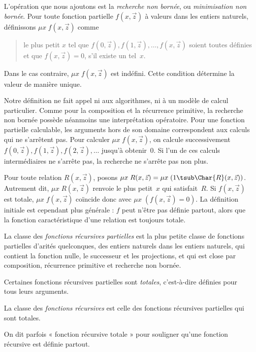 \documentclass[../../../include/open-logic-section]{subfiles}
\begin{document}
L'opération que nous ajoutons est la \emph{recherche non bornée},
ou \emph{minimisation non bornée}. Pour toute fonction partielle
$f(x,\vec z)$ à valeurs dans les entiers naturels, définissons
$\mu x \; f(x,\vec z)$ comme
\begin{quote}
  le plus petit $x$ tel que $f(0,\vec z),f(1,\vec z),
  \dots,f(x,\vec z)$ soient toutes définies et que
  $f(x,\vec z)=0$, s'il existe un tel~$x$.
\end{quote}
Dans le cas contraire, $\mu x \; f(x,\vec z)$ est indéfini.
Cette condition détermine la valeur de manière unique.

\begin{explain}
Notre définition ne fait appel ni aux algorithmes, ni à un modèle de calcul
particulier. Comme pour la composition et la récurrence
primitive, la recherche non bornée possède néanmoins une
interprétation opératoire. Pour une fonction partielle
calculable, les arguments hors de son domaine correspondent
aux calculs qui ne s'arrêtent pas. Pour calculer
$\mu x \; f(x,\vec z)$, on calcule successivement
$f(0,\vec z),f(1,\vec z),f(2,\vec z),\dots$ jusqu'à obtenir~$0$.
Si l'un de ces calculs intermédiaires ne s'arrête pas,
la recherche ne s'arrête pas non plus.
\end{explain}

Pour toute relation $R(x,\vec z)$, posons
$\mu x \; R(x,\vec z)=\mu x \; (1 \tsub \Char{R}(x,\vec z))$.
Autrement dit, $\mu x \; R(x,\vec z)$ renvoie le plus petit~$x$
qui satisfait~$R$. Si $f(x,\vec z)$ est totale,
$\mu x \; f(x,\vec z)$ coïncide donc avec
$\mu x \; (f(x,\vec z)=0)$. La définition initiale est
cependant plus générale : $f$ peut n'être pas définie
partout, alors que la fonction caractéristique d'une
relation est toujours totale.

\begin{defn}
La classe des \emph{fonctions récursives partielles} est la plus
petite classe de fonctions partielles d'arités quelconques,
des entiers naturels dans les entiers naturels, qui contient
la fonction nulle, le successeur et les projections, et qui
est close par composition, récurrence primitive et recherche
non bornée.
\end{defn}

Certaines fonctions récursives partielles sont \emph{totales},
c'est-à-dire définies pour tous leurs arguments.

\begin{defn}
La classe des \emph{fonctions récursives} est celle des
fonctions récursives partielles qui sont totales.
\end{defn}

On dit parfois « fonction récursive totale » pour souligner
qu'une fonction récursive est définie partout.
\end{document}
